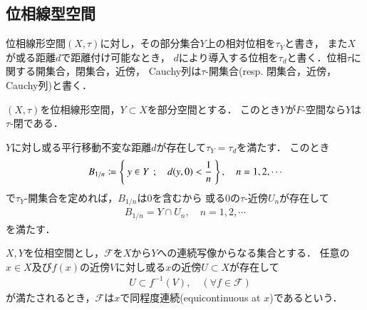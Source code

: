 \subsection{位相線型空間}
	
	位相線形空間$(X,\tau)$に対し，その部分集合$Y$上の相対位相を$\tau_Y$と書き，
	また$X$が或る距離$d$で距離付け可能なとき，
	$d$により導入する位相を$\tau_d$と書く．位相$\tau$に関する開集合，閉集合，近傍，
	Cauchy列は$\tau$-開集合(resp. 閉集合，近傍，Cauchy列)と書く．
	
	\begin{screen}
		\begin{thm}
			$(X,\tau)$を位相線形空間，$Y \subset X$を部分空間とする．
			このとき$Y$が$F$-空間なら$Y$は$\tau$-閉である．
		\end{thm}
	\end{screen}
	
	\begin{prf}
		$Y$に対し或る平行移動不変な距離$d$が存在して$\tau_Y = \tau_d$を満たす．
		このとき
		\begin{align}
			B_{1/n} \coloneqq \left\{\ y \in Y\ \, ; \quad d(y,0) < \frac{1}{n}\ \right\},
			\quad n=1,2,\cdots
		\end{align}
		で$\tau_Y$-開集合を定めれば，$B_{1/n}$は$0$を含むから
		或る0の$\tau$-近傍$U_n$が存在して
		\begin{align}
			B_{1/n} = Y \cap U_n, \quad n=1,2,\cdots
		\end{align}
		を満たす．
	\end{prf}
	
	\begin{screen}
		\begin{dfn}[同程度連続]
			$X,Y$を位相空間とし，$\mathscr{F}$を$X$から$Y$への連続写像からなる集合とする．
			任意の$x \in X$及び$f(x)$の近傍$V$に対し或る$x$の近傍$U \subset X$が存在して
			\begin{align}
				\quad U \subset f^{-1}(V),\quad (\forall f \in \mathscr{F})
			\end{align}
			が満たされるとき，$\mathscr{F}$は$x$で同程度連続(equicontinuous at $x$)であるという．
		\end{dfn}
	\end{screen}